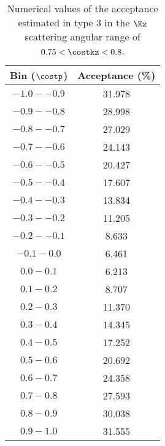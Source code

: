\begin{table}[!h] 
  \begin{center}
  \caption{Numerical values of the acceptance estimated in type 3 in the $\Kz$ scattering angular range of \textbf{$0.75<\costkz<0.8$}.}
  \centering
  \begin{threeparttable}
    \begin{tabular}{cc}
    Bin ($\costp$) & Acceptance (\%) \\
    \midrule\midrule
    $-1.0 - -0.9$ & 31.978 \\
    \midrule
    $-0.9 - -0.8$ & 28.998 \\
    \midrule
    $-0.8 - -0.7$ & 27.029 \\
    \midrule
    $-0.7 - -0.6$ & 24.143 \\
    \midrule
    $-0.6 - -0.5$ & 20.427 \\
    \midrule
    $-0.5 - -0.4$ & 17.607 \\
    \midrule
    $-0.4 - -0.3$ & 13.834 \\
    \midrule
    $-0.3 - -0.2$ & 11.205 \\
    \midrule
    $-0.2 - -0.1$ & 8.633 \\
    \midrule
    $-0.1 - 0.0$ & 6.461 \\
    \midrule
    $0.0 - 0.1$ & 6.213 \\
    \midrule
    $0.1 - 0.2$ & 8.707 \\
    \midrule
    $0.2 - 0.3$ & 11.370 \\
    \midrule
    $0.3 - 0.4$ & 14.345 \\
    \midrule
    $0.4 - 0.5$ & 17.252 \\
    \midrule
    $0.5 - 0.6$ & 20.692 \\
    \midrule
    $0.6 - 0.7$ & 24.358 \\
    \midrule
    $0.7 - 0.8$ & 27.593 \\
    \midrule
    $0.8 - 0.9$ & 30.038 \\
    \midrule
    $0.9 - 1.0$ & 31.555 \\
    \end{tabular}
  \end{threeparttable}
  \label{tab-Pl-acc_35}
  \end{center}
\end{table}

